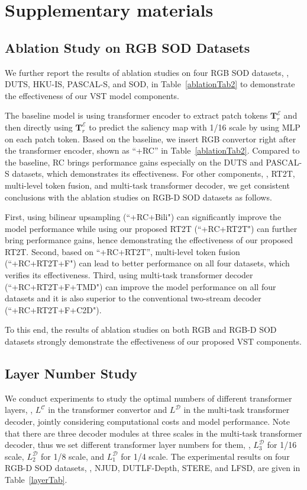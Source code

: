 \documentclass[10pt,twocolumn,letterpaper]{article}
\begin{document}
\section{Supplementary materials}
\subsection{Ablation Study on RGB SOD Datasets}

We further report the results of ablation studies on four RGB SOD datasets, \ie, DUTS, HKU-IS, PASCAL-S, and SOD, in Table~\ref{ablationTab2} to demonstrate the effectiveness of our VST model components.

The baseline model is using transformer encoder to extract patch tokens $\bm{T}_r^{\mathcal{E}}$ and then directly using $\bm{T}_r^{\mathcal{E}}$ to predict the saliency map with 1/16 scale by using MLP on each patch token.
Based on the baseline, we insert RGB convertor right after the transformer encoder, shown as ``+RC'' in Table~\ref{ablationTab2}.
Compared to the baseline, RC brings performance gains especially on the DUTS and PASCAL-S datasets, which demonstrates its effectiveness.
For other components, \ie, RT2T, multi-level token fusion, and multi-task transformer decoder, we get consistent conclusions with the ablation studies on RGB-D SOD datasets as follows.

First, using bilinear upsampling (``+RC+Bili") can significantly improve the model performance while using our proposed RT2T (``+RC+RT2T") can further bring performance gains, hence demonstrating the effectiveness of our proposed RT2T.
Second, based on ``+RC+RT2T'', multi-level token fusion (``+RC+RT2T+F") can lead to better performance on all four datasets, which verifies its effectiveness.
Third, using multi-task transformer decoder (``+RC+RT2T+F+TMD") can improve the model performance on all four datasets and it is also superior to the conventional two-stream decoder (``+RC+RT2T+F+C2D").

To this end, the results of ablation studies on both RGB and RGB-D SOD datasets strongly demonstrate the effectiveness of our proposed VST components.


\subsection{Layer Number Study}
We conduct experiments to study the optimal numbers of different transformer layers, \ie, $L^{\mathcal{C}}$ in the transformer convertor and $L^{\mathcal{D}}$ in the multi-task transformer decoder, jointly considering computational costs and model performance. Note that there are three decoder modules at three scales in the multi-task transformer decoder, thus we set different transformer layer numbers for them, \ie, $L_3^{\mathcal{D}}$ for 1/16 scale, $L_2^{\mathcal{D}}$ for 1/8 scale, and $L_1^{\mathcal{D}}$ for 1/4 scale.
The experimental results on four RGB-D SOD datasets, \ie, NJUD, DUTLF-Depth, STERE, and LFSD, are given in Table~\ref{layerTab}.
\end{document}
